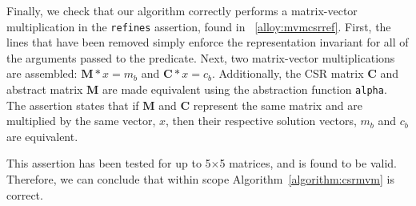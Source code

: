 \documentclass[sigconf]{acmart}
\begin{document}
Finally, we check that our algorithm correctly performs a matrix-vector multiplication in the \texttt{refines} assertion, found in \figurename~\ref{alloy:mvmcsrref}.  First, the lines that have been removed simply enforce the representation invariant for all of the arguments passed to the predicate.  Next, two matrix-vector multiplications are assembled: $\bm{M} * x = m_b$ and $\bm{C} * x = c_b$.  Additionally, the CSR matrix $\bm{C}$ and abstract matrix $\bm{M}$ are made equivalent using the abstraction function \texttt{alpha}.
The assertion states that if $\bm{M}$ and $\bm{C}$ represent the same matrix and are multiplied by the same vector, $x$, then their respective solution vectors, $m_b$ and $c_b$ are equivalent.

This assertion has been tested for up to 5$\times$5 matrices, and is found to be valid.  Therefore, we can conclude that within scope Algorithm~\ref{algorithm:csrmvm} is correct.



\end{document}
